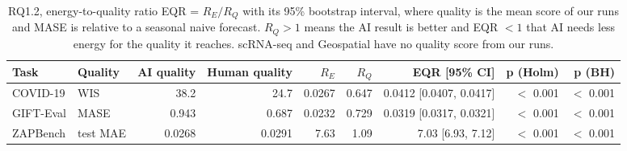 \begin{table}[ht]
\centering
\caption{RQ1.2, energy-to-quality ratio EQR = $R_E/R_Q$ with its 95\% bootstrap interval, where quality is the mean score of our runs and MASE is relative to a seasonal naive forecast. $R_Q > 1$ means the AI result is better and EQR $< 1$ that AI needs less energy for the quality it reaches. scRNA-seq and Geospatial have no quality score from our runs.} 
\label{tab:04_rq1_2_eqr}
\begingroup\small
\begin{tabular}{llrrrrrrr}
  \toprule
Task & Quality & AI quality & Human quality & $R_E$ & $R_Q$ & EQR [95\% CI] & p (Holm) & p (BH) \\ 
  \midrule
COVID-19 & WIS & 38.2 & 24.7 & 0.0267 & 0.647 & 0.0412 [0.0407, 0.0417] & $<$ 0.001 & $<$ 0.001 \\ 
  GIFT-Eval & MASE & 0.943 & 0.687 & 0.0232 & 0.729 & 0.0319 [0.0317, 0.0321] & $<$ 0.001 & $<$ 0.001 \\ 
  ZAPBench & test MAE & 0.0268 & 0.0291 & 7.63 & 1.09 & 7.03 [6.93, 7.12] & $<$ 0.001 & $<$ 0.001 \\ 
   \bottomrule
\end{tabular}
\endgroup
\end{table}
